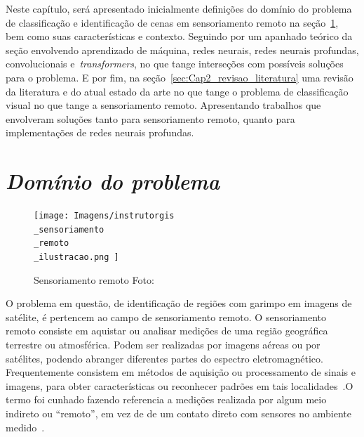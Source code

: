 Neste capítulo, será apresentado inicialmente definições do domínio do problema de classificação e identificação de cenas em sensoriamento remoto na seção~\ref{sec:Cap2_dominio}, bem como suas características e contexto. Seguindo por um apanhado teórico da seção envolvendo aprendizado de máquina, redes neurais, redes neurais profundas, convolucionais e~\textit{transformers}, no que tange interseções com possíveis soluções para o problema.
E por fim, na seção~\ref{sec:Cap2_revisao_literatura} uma revisão da literatura e do atual estado da arte no que tange o problema de classificação visual no que tange a sensoriamento remoto. Apresentando trabalhos que envolveram soluções tanto para sensoriamento remoto, quanto para implementações de redes neurais profundas.



\section{\textit{Domínio do problema}}\label{sec:Cap2_dominio}
\begin{figure}[!ht]
    \centering
    \texttt{[image: 
        Imagens/instrutorgis\\\_sensoriamento\\\_remoto\\\_ilustracao.png
    ]}
    \caption{Sensoriamento remoto Foto:\cite{InstrutorGIS}}
\label{fig:sensoriamento}
\end{figure}

O problema em questão, de identificação de regiões com garimpo em imagens de satélite, é pertencem ao campo de sensoriamento remoto. O sensoriamento remoto consiste em aquistar ou analisar medições de uma região geográfica terrestre ou atmosférica. Podem ser realizadas por imagens aéreas ou por satélites, podendo abranger diferentes partes do espectro eletromagnético.
Frequentemente consistem em métodos de aquisição ou processamento de sinais e imagens, para obter características ou reconhecer padrões em tais localidades~\cite{emery2017introduction}.O termo foi cunhado fazendo referencia a medições realizada por algum meio indireto ou “remoto”, em vez de de um contato direto com sensores no ambiente medido~\cite{emery2017introduction}.


